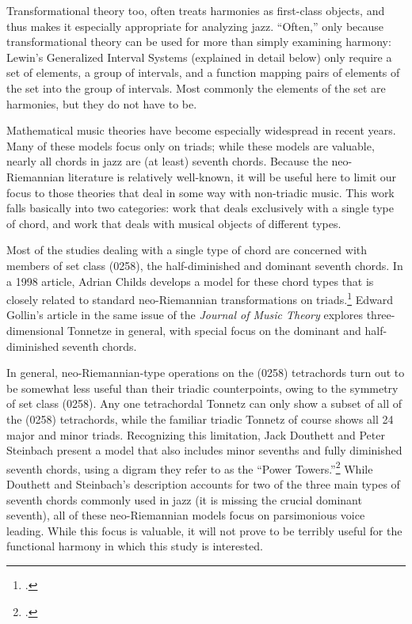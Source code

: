 \documentclass[diss]{subfiles}
\begin{document}
Transformational theory too, often treats harmonies as first-class objects,
and thus makes it especially appropriate for analyzing jazz. “Often,” only
because transformational theory can be used for more than simply examining
harmony: Lewin’s Generalized Interval Systems (explained in detail below) only
require a set of elements, a group of intervals, and a function mapping pairs
of elements of the set into the group of intervals.
Most commonly the elements of the set are harmonies, but they do not have to
be.

Mathematical music theories have become especially widespread in recent
years. Many of these models focus only on triads; while these
models are valuable, nearly all chords in jazz are (at least) seventh chords.
Because the neo-Riemannian literature is relatively well-known, it will be
useful here to limit our focus to those theories that deal in some way with
non-triadic music. This work falls basically into two categories: work
that deals exclusively with a single type of chord, and work that deals with
musical objects of different types.

Most of the studies dealing with a single type of chord are concerned with
members of set class (0258), the half-diminished and dominant seventh chords.
In a 1998 article, Adrian Childs develops a model for these chord types that
is closely related to standard neo-Riemannian transformations on
triads.\footcite{childs:1998} Edward Gollin’s article in the same issue of the
\emph{Journal of Music Theory} explores three-dimensional Tonnetze in
general, with special focus on the dominant and half-diminished seventh
chords.

In general, neo-Riemannian-type operations on the (0258) tetrachords turn out
to be somewhat less useful than their triadic counterpoints, owing to the
symmetry of set class (0258). Any one tetrachordal Tonnetz can only
show a subset of all of the (0258) tetrachords, while the familiar triadic
Tonnetz of course shows all 24 major and minor triads.  Recognizing this
limitation, Jack Douthett and Peter Steinbach present a model that also
includes minor sevenths and fully diminished seventh chords, using a digram
they refer to as the “Power Towers.”\footcite[255--56]{douthettsteinbach:1998}
While Douthett and Steinbach’s description accounts for two of the three main
types of seventh chords commonly used in jazz (it is missing the crucial
dominant seventh), all of these neo-Riemannian models focus on parsimonious
voice leading. While this focus is valuable, it will not prove to be terribly
useful for the functional harmony in which this study is interested.
\end{document}
